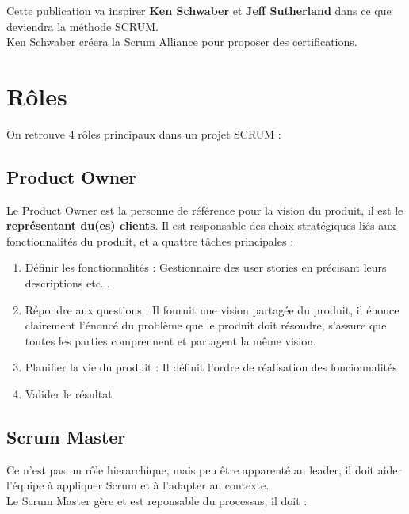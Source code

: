 \documentclass{report}
\begin{document}
		Cette publication va inspirer \textbf{Ken Schwaber} et \textbf{Jeff Sutherland} dans ce que deviendra la méthode SCRUM.\\

		Ken Schwaber créera la Scrum Alliance pour proposer des certifications.\\

	\section{Rôles}

		On retrouve 4 rôles principaux dans un projet SCRUM : \\

		\subsection{Product Owner}

			Le Product Owner est la personne de référence pour la vision du produit, il est le \textbf{représentant du(es) clients}.
			Il est responsable des choix stratégiques liés aux fonctionnalités du produit, et a quattre tâches principales : \\

			\begin{enumerate}
				\item Définir les fonctionnalités : Gestionnaire des user stories en précisant leurs descriptions etc...
				\item Répondre aux questions : Il fournit une vision partagée du produit, il énonce clairement l'énoncé du problème que le produit doit résoudre, s'assure que toutes les parties comprennent et partagent la même vision.
				\item Planifier la vie du produit : Il définit l'ordre de réalisation des foncionnalités
				\item Valider le résultat
			\end{enumerate}

		\subsection{Scrum Master}

			Ce n'est pas un rôle hierarchique, mais peu être apparenté au leader, il doit aider l'équipe à appliquer Scrum et à l'adapter au contexte.\\

			Le Scrum Master gère et est reponsable du processus, il doit : \\
\end{document}

